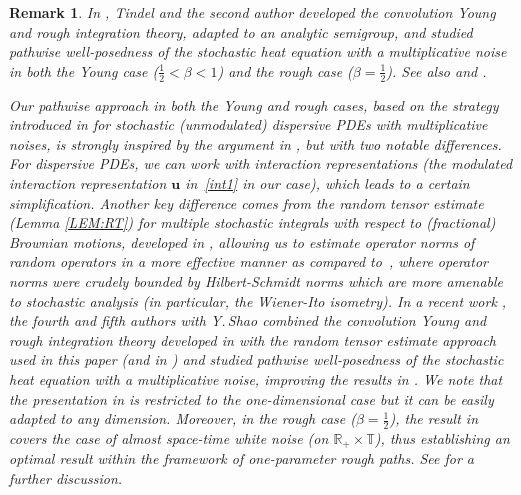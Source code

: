 \documentclass[letterpaper, 11pt,  reqno]{amsart}
\newtheorem{remark}[theorem]{Remark}
\newcommand{\1}{\hspace{0.5mm}\textup{I}\hspace{0.5mm}}
\newcommand{\R}{\mathbb{R}}
\newcommand{\T}{\mathbb{T}}
\newcommand{\be}{\beta}
\newcommand{\uu}{\mathbf{u}}
\numberwithin{equation}{section}
\numberwithin{theorem}{section}
\begin{document}
\begin{remark}\rm


In \cite{GT10}, 
Tindel and the second author
developed the convolution Young and rough integration theory, 
adapted to an analytic semigroup, 
and 
studied pathwise well-posedness
of the stochastic heat equation with a multiplicative noise 
in both the Young case ($\frac 12 < \be < 1$) and 
the rough case ($\be = \frac 12$).
See also 
\cite{GLT, GH} %
and \cite[Exercises 4.16 and~4.17]{FH20}.


Our pathwise approach in both the Young and rough cases, based
on the strategy introduced in \cite{CLO2, CLO3, COZ, CLOO}
for  stochastic 
(unmodulated)
dispersive PDEs with multiplicative noises, 
is strongly inspired by the argument in \cite{GT10}, but
with two notable differences.
For dispersive PDEs, 
we can work with interaction representations
(the modulated interaction representation $\uu$ in~\eqref{int1} in our case), 
which leads to a certain simplification.
Another key difference comes from 
the random tensor estimate (Lemma \ref{LEM:RT})
for multiple stochastic integrals
with respect to (fractional) Brownian motions,
developed in \cite{OWZ,  CLO2}, 
allowing us to estimate operator norms
of random operators in a more effective manner
as compared to~\cite{GT10}, 
where operator norms were crudely bounded by 
Hilbert-Schmidt norms
which are 
 more amenable to stochastic analysis
(in particular, the Wiener-Ito isometry).
In a recent work \cite{SLO}, 
the fourth and fifth authors with Y.\,Shao
combined
the convolution Young and rough integration theory developed in \cite{GT10} 
with  the random tensor estimate approach
used 
in this paper (and in \cite{CLO2, CLO3, COZ, CLOO})
and studied
pathwise well-posedness of the stochastic heat equation with a multiplicative noise, 
improving the results in \cite{GT10}. 
We note that the presentation in \cite{SLO} is restricted
to the one-dimensional case but it can be easily adapted to any dimension.
Moreover, 
 in the rough case ($\be = \frac 12$), 
the result in \cite{GT10} covers the case of almost space-time white noise
(on $\R_+ \times \T$), 
thus establishing an optimal result
within the framework of one-parameter rough paths.
See \cite{SLO} for a further discussion.









\end{remark}
\end{document}
